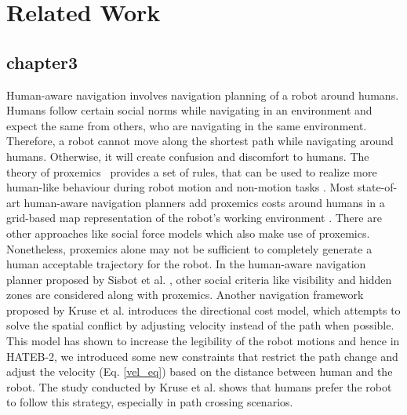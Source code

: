 
\ifdefined{}
\else
\setcounter{chapter}{1} %
\dominitoc
\faketableofcontents
\fi

\chapter{Related Work}
\minitoc
{}
\label{chap:2}



\section{chapter3}
Human-aware navigation involves navigation planning of a robot around humans. Humans follow certain social norms while navigating in an environment and expect the same from others, who are navigating in the same environment. Therefore, a robot cannot move along the shortest path while navigating around humans. Otherwise, it will create confusion and discomfort to humans. The theory of proxemics~\cite{hall_book_1966} provides a set of rules, that can be used to realize more human-like behaviour during robot motion and non-motion tasks \cite{rios2015proxemics}. Most state-of-art human-aware navigation planners add proxemics costs around humans in a grid-based map representation of the robot's working environment \cite{kruse_ras_2013}. There are other approaches like social force models \cite{helbing1995social} which also make use of proxemics. Nonetheless, proxemics alone may not be sufficient to completely generate a human acceptable trajectory for the robot. In the human-aware navigation planner proposed by Sisbot et al. \cite{sisbot_tr_2007}, other social criteria like visibility and hidden zones are considered along with proxemics. Another navigation framework proposed by Kruse et al. \cite{kruse_arso_2012} introduces the directional cost model, which attempts to solve the spatial conflict by adjusting velocity instead of the path when possible. This model has shown to increase the legibility of the robot motions and hence in HATEB-2, we introduced some new constraints that restrict the path change and adjust the velocity (Eq. \eqref{vel_eq}) based on the distance between human and the robot. The study conducted by Kruse et al. \cite{kruse2014evaluating} shows that humans prefer the robot to follow this strategy, especially in path crossing scenarios. 

